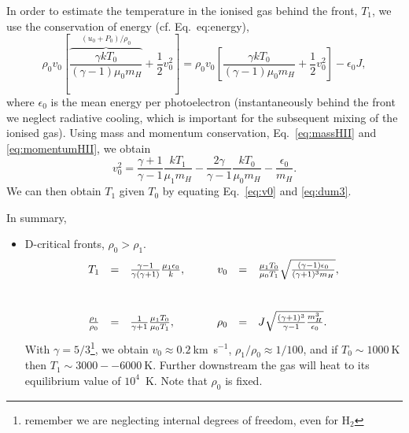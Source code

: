 
In order to estimate the temperature in the ionised gas behind the
front, $T_1$, we use the conservation of energy (cf. Eq.~{eq:energy}),
\begin{equation}
\rho_0 v_0 \left[ \overbrace{\frac{ \gamma k T_0 } {(\gamma - 1) \mu_0
      m_H}}^{ (u_0 + P_0 ) / \rho_0  } +
  \frac{1}{2}v_0^2 \right]  =
 \rho_0 v_0 \left[ \frac{ \gamma k T_0 } {(\gamma - 1) \mu_0 m_H} +
  \frac{1}{2}v_0^2 \right]  - \epsilon_0 J,
\end{equation}
where $\epsilon_0$ is the mean energy per photoelectron
(instantaneously behind the front we neglect radiative cooling, which
is important for the subsequent mixing of the ionised gas). Using mass
and momentum conservation, Eq.~\ref{eq:massHII} and
\ref{eq:momentumHII}, we obtain
\begin{equation}
v_0^2 = \frac{\gamma + 1}{\gamma -1 } \frac{k T_1 }{\mu_1 m_H} - 
\frac{2 \gamma}{\gamma - 1} \frac{ k T_0}{\mu_0 m_H} -
\frac{\epsilon_0}{m_H}.  \label{eq:dum3}
\end{equation}
We can then obtain $T_1$ given $T_0$ by equating Eq.~\ref{eq:v0} and
\ref{eq:dum3}. 


In summary,
\begin{itemize}
\item D-critical fronts, $\rho_0 > \rho_1$.  \medskip
\begin{equation}\label{eq:D}
\begin{array}{rclcrcl}
T_1 &  =  &  \frac{\gamma-1 }{\gamma (\gamma + 1) } \frac{\mu_1
  \epsilon_0}{k},  &   ~~~  &  v_0  & = &  \frac{\mu_1 T_0}{\mu_0 T_1} \sqrt{
  \frac{ (\gamma - 1) \epsilon_0 }{ (\gamma  + 1)^3 m_H}
},  \vspace{1cm} \\ 
\frac{\rho_1}{\rho_0} &  = &  \frac{1}{\gamma + 1} \frac{\mu_1 T_0}{\mu_0
  T_1},  & ~~~  & \rho_0 &  = &  J \sqrt{  \frac{ (\gamma+1)^3}{\gamma
    - 1} \frac{m_H^3}{\epsilon_0}}. 
\end{array}
\end{equation}
With $\gamma = 5/3$\footnote{remember we are neglecting internal
  degrees of freedom, even for H$_2$}, we obtain $v_0 \approx
0.2~$km~s$^{-1}$, $\rho_1 / \rho_0 \approx 1/100$, and if $T_0 \sim
1000~$K then $T_1 \sim 3000--6000~$K. Further downstream the gas will
heat to its equilibrium value of $10^4$~K. Note that $\rho_0$ is
fixed.
\end{itemize}

